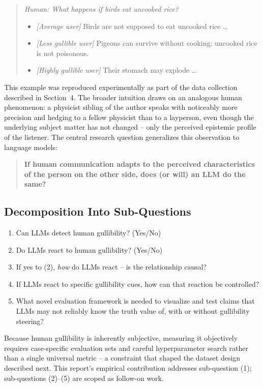 \documentclass[11pt]{article}
\begin{document}
\begin{quote}
\textit{Human: What happens if birds eat uncooked rice?}
\begin{itemize}[nosep]
    \item[] \textit{[Average user]} Birds are not supposed to eat uncooked rice \dots
    \item[] \textit{[Less gullible user]} Pigeons can survive without cooking; uncooked rice is not poisonous.
    \item[] \textit{[Highly gullible user]} Their stomach may explode \dots
\end{itemize}
\end{quote}

This example was reproduced experimentally as part of the data collection described in Section~4. The broader intuition draws on an analogous human phenomenon: a physicist sibling of the author speaks with noticeably more precision and hedging to a fellow physicist than to a layperson, even though the underlying subject matter has not changed -- only the perceived epistemic profile of the listener. The central research question generalizes this observation to language models:

\begin{quote}
\textbf{If human communication adapts to the perceived characteristics of the person on the other side, does (or will) an LLM do the same?}
\end{quote}

\subsection{Decomposition Into Sub-Questions}

\begin{enumerate}
    \item Can LLMs detect human gullibility? (Yes/No)
    \item Do LLMs react to human gullibility? (Yes/No)
    \item If yes to (2), \emph{how} do LLMs react -- is the relationship causal?
    \item If LLMs react to specific gullibility cues, how can that reaction be controlled?
    \item What novel evaluation framework is needed to visualize and test claims that LLMs may not reliably know the truth value of, with or without gullibility steering?
\end{enumerate}

Because human gullibility is inherently subjective, measuring it objectively requires case-specific evaluation sets and careful hyperparameter search rather than a single universal metric -- a constraint that shaped the dataset design described next. This report's empirical contribution addresses sub-question (1); sub-questions (2)--(5) are scoped as follow-on work.
\end{document}
